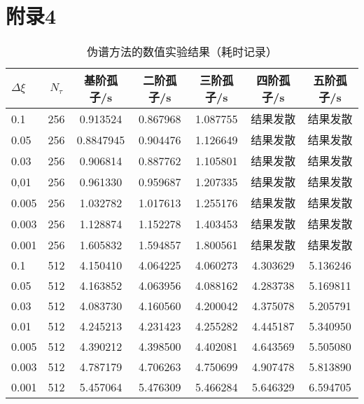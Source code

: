 \section{附录4}
\begin{table}[htbp]
  \centering
  \caption*{伪谱方法的数值实验结果（耗时记录）}
  \begin{tabular}{lcccccc}
    \toprule 
      $\Delta \xi$ & $N_\tau$ & 基阶孤子/s & 二阶孤子/s & 三阶孤子/s & 四阶孤子/s & 五阶孤子/s \\
    \midrule  
      0.1 & 256 & 0.913524 & 0.867968 & 1.087755 & 结果发散 & 结果发散 \\
      0.05 & 256 & 0.8847945 & 0.904476 & 1.126649 & 结果发散 & 结果发散 \\
      0.03 & 256 & 0.906814 & 0.887762 & 1.105801 & 结果发散 & 结果发散 \\
      0,01 & 256 & 0.961330 & 0.959687 & 1.207335 & 结果发散 & 结果发散 \\
      0.005 & 256 & 1.032782 & 1.017613 & 1.255176 & 结果发散 & 结果发散 \\
      0.003 & 256 & 1.128874 & 1.152278 & 1.403453 & 结果发散 & 结果发散 \\
      0.001 & 256 & 1.605832 & 1.594857 & 1.800561 & 结果发散 & 结果发散 \\
      0.1 & 512 & 4.150410 & 4.064225 & 4.060273 & 4.303629 & 5.136246 \\
      0.05 & 512 & 4.163852 & 4.063956 & 4.088162 & 4.283738 & 5.169811 \\
      0.03 & 512 & 4.083730 & 4.160560 & 4.200042 & 4.375078 & 5.205791 \\
      0.01 & 512 & 4.245213 & 4.231423 & 4.255282 & 4.445187 & 5.340950 \\
      0.005 & 512 & 4.390212 & 4.398500 & 4.402081 & 4.643569 & 5.505080 \\
      0.003 & 512 & 4.787179 & 4.706263 & 4.750699 & 4.907478 & 5.813890 \\
      0.001 & 512 & 5.457064 & 5.476309 & 5.466284 & 5.646329 & 6.594705 \\
    \bottomrule
    \end{tabular}
\end{table}


